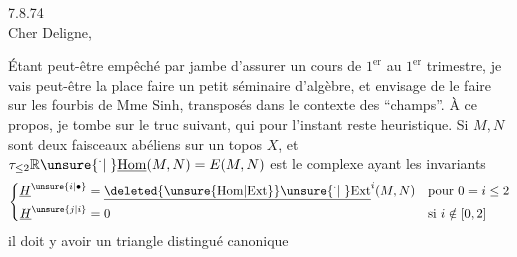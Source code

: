 
  7.8.74\\
Cher Deligne,\\


Étant peut-être empêché par  jambe d'assurer un cours de $1^{\mathrm{er}}$  au $1^{\mathrm{er}}$ trimestre, je vais peut-être  la place faire un petit séminaire d'algèbre, et envisage de le faire sur les fourbis de Mme Sinh,  transposés dans le contexte des ``champs''. À ce propos, je tombe sur le truc suivant, qui pour l'instant reste heuristique. Si $M,N$ sont deux faisceaux abéliens sur un topos $X$, et $\tau_{\leq 2}\mathbb{R}\unsure{{}^{\cdot}|\phantom{{}^{\cdot}}}\underline{\mathrm{Hom}}(M,N)=E(M,N)$ est le complexe ayant les invariants
\[
\left\{\begin{aligned}
\underline{H}^{\unsure{i|\bullet}}&=\underline{\deleted{\unsure{\mathrm{Hom}|\mathrm{Ext}}}\unsure{{}^{\cdot}|\phantom{{}^{\cdot}}}\mathrm{Ext}}^{i}(M,N) &&\text{pour }0=i\leq 2\\
\underline{H}^{\unsure{j|i}}&=0 &&\text{si }i\notin[0,2]
\end{aligned}\right.
\]
il doit y avoir un triangle distingué canonique

